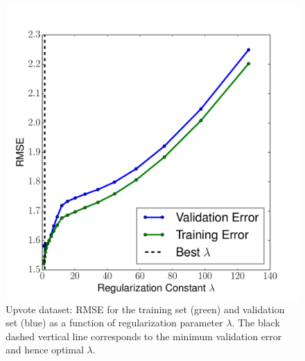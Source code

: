 \documentclass[12pt]{amsart}
\begin{document}
\begin{figure}[H]
	\includegraphics[width=\columnwidth]{upvote_rmse.pdf}
    \caption{Upvote dataset: RMSE for the training set (green) and validation set (blue) as a function of regularization parameter $\lambda$.  The black dashed vertical line corresponds to the minimum validation error and hence optimal $\lambda$.}
    \label{fig:yelp_upvote_rmse}
\end{figure}
\end{document}
